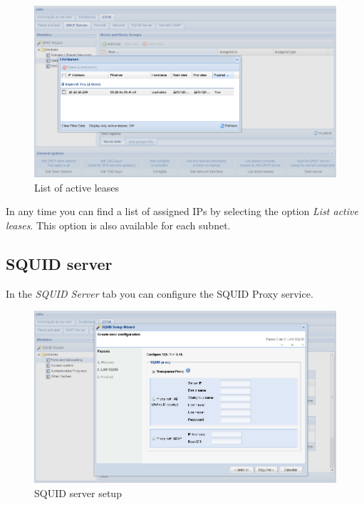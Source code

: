 \begin{figure}[H]
    \begin{center}
    \includegraphics[scale=0.38]{screenshots/etfw/etfw_dhcp_leases_01.png}
    \caption{List of active leases}
    \label{fig:etfw_dhcp_leases_01}
    \end{center}
\end{figure}

In any time you can find a list of assigned IPs by selecting the option \textit{List active leases}. This option is also available for each subnet.

\subsection{SQUID server}

In the \textit{SQUID Server} tab you can configure the SQUID Proxy service.

\begin{figure}[H]
    \begin{center}
    \includegraphics[scale=0.38]{screenshots/etfw/etfw_squid_wizard_01.png}
    \caption{SQUID server setup}
    \label{fig:etfw_squid_wizard_01}
    \end{center}
\end{figure}

